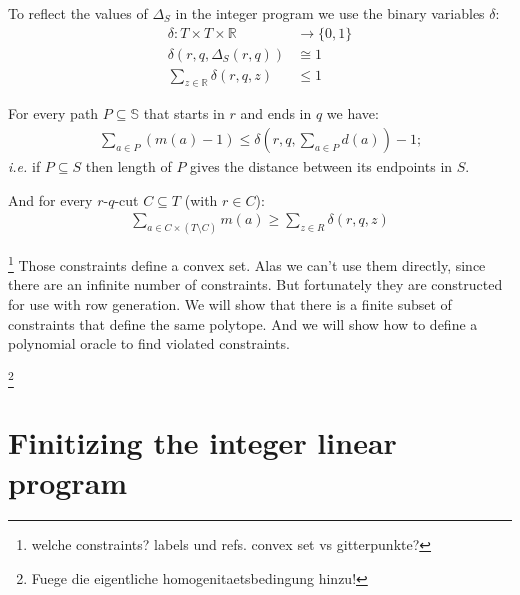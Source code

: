 \documentclass[a4paper]{amsart} %
\def\ie{\emph{i.e.}}
\newcommand{\todo}[1]{\footnote{#1}}
\begin{document}
To reflect the values of \(\Delta_S\) in the integer program we use the binary variables \(\delta\):
\begin{align}
  \delta \colon T \times T \times \mathbb{R} & \to \{0,1\} \\
  \delta\left(r, q, \Delta_S\left(r,q\right)\right) &\cong 1 \\
  \label{onlyOne}
  \sum_{z \in \mathbb{R}} \delta(r, q, z) &\leq 1
\end{align}

For every path \(P \subseteq \mathbb{S}\) that starts in \(r\) and ends in \(q\) we have:
\begin{align}
\label{zwingHoch}
\sum_{a \in P} (m(a) - 1) \leq \delta \left(r,q, \sum_{a \in P} d \left(a\right)\right) - 1 \textrm{;}
\end{align}
\ie{} if \(P \subseteq S\) then length of \(P\) gives
the distance between its endpoints in \(S\).

And for every \(r\)-\(q\)-cut \(C \subseteq T\) (with \(r \in C\)):
\begin{align}
\label{zwingRunter}
  \sum_{a \in C \times (T \setminus C)} m(a) \geq \sum_{z \in R} \delta (r,q, z)
\end{align}








\todo{welche constraints?  labels und refs.  convex set vs gitterpunkte?}
Those constraints define a convex set.  Alas we can't use them
directly, since there are an infinite number of constraints.  But
fortunately they are constructed for use with row generation.  We will
show that there is a finite subset of constraints that define the same
polytope.  And we will show how to define a polynomial oracle to find
violated constraints.

\todo{Fuege die eigentliche homogenitaetsbedingung hinzu!}


\section{Finitizing the integer linear program}
\end{document}
